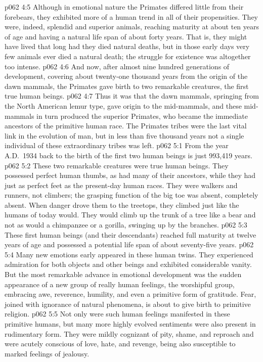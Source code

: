 \vs p062 4:5 Although in emotional nature the Primates differed little from their forebears, they exhibited more of a human trend in all of their propensities. They were, indeed, splendid and superior animals, reaching maturity at about ten years of age and having a natural life span of about forty years. That is, they might have lived that long had they died natural deaths, but in those early days very few animals ever died a natural death; the struggle for existence was altogether too intense.
\vs p062 4:6 And now, after almost nine hundred generations of development, covering about twenty\hyp{}one thousand years from the origin of the dawn mammals, the Primates  gave birth to two remarkable creatures, the first true human beings.
\pc \vs p062 4:7 Thus it was that the dawn mammals, springing from the North American lemur type, gave origin to the mid\hyp{}mammals, and these mid\hyp{}mammals in turn produced the superior Primates, who became the immediate ancestors of the primitive human race. The Primates tribes were the last vital link in the evolution of man, but in less than five thousand years not a single individual of these extraordinary tribes was left.
\vs p062 5:1 From the year A.D.~1934 back to the birth of the first two human beings is just 993,419 years.
\vs p062 5:2 These two remarkable creatures were true human beings. They possessed perfect human thumbs, as had many of their ancestors, while they had just as perfect feet as the present\hyp{}day human races. They were walkers and runners, not climbers; the grasping function of the big toe was absent, completely absent. When danger drove them to the treetops, they climbed just like the humans of today would. They would climb up the trunk of a tree like a bear and not as would a chimpanzee or a gorilla, swinging up by the branches.
\vs p062 5:3 These first human beings (and their descendants) reached full maturity at twelve years of age and possessed a potential life span of about seventy\hyp{}five years.
\vs p062 5:4 Many new emotions early appeared in these human twins. They experienced admiration for both objects and other beings and exhibited considerable vanity. But the most remarkable advance in emotional development was the sudden appearance of a new group of really human feelings, the worshipful group, embracing awe, reverence, humility, and even a primitive form of gratitude. Fear, joined with ignorance of natural phenomena, is about to give birth to primitive religion.
\vs p062 5:5 Not only were such human feelings manifested in these primitive humans, but many more highly evolved sentiments were also present in rudimentary form. They were mildly cognizant of pity, shame, and reproach and were acutely conscious of love, hate, and revenge, being also susceptible to marked feelings of jealousy.

